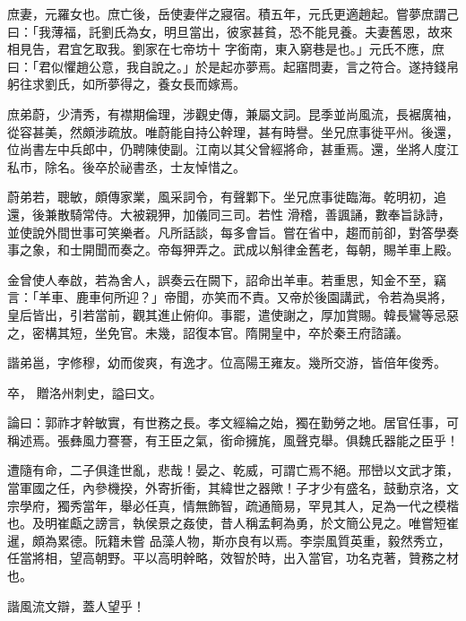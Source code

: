 \begin{pinyinscope}
 庶妻，元羅女也。庶亡後，岳使妻伴之寢宿。積五年，元氏更適趙起。嘗夢庶謂己曰：「我薄福，託劉氏為女，明旦當出，彼家甚貧，恐不能見養。夫妻舊恩，故來相見告，君宜乞取我。劉家在七帝坊十
 字銜南，東入窮巷是也。」元氏不應，庶曰：「君似懼趙公意，我自說之。」於是起亦夢焉。起寤問妻，言之符合。遂持錢帛躬往求劉氏，如所夢得之，養女長而嫁焉。



 庶弟蔚，少清秀，有襟期倫理，涉觀史傳，兼屬文詞。昆季並尚風流，長裾廣袖，從容甚美，然頗涉疏放。唯蔚能自持公幹理，甚有時譽。坐兄庶事徙平州。後還，位尚書左中兵郎中，仍聘陳使副。江南以其父曾經將命，甚重焉。還，坐將人度江私市，除名。後卒於祕書丞，士友悼惜之。



 蔚弟若，聰敏，頗傳家業，風采詞令，有聲鄴下。坐兄庶事徙臨海。乾明初，追還，後兼散騎常侍。大被親狎，加儀同三司。若性
 滑稽，善諷誦，數奉旨詠詩，並使說外間世事可笑樂者。凡所話談，每多會旨。嘗在省中，趨而前卻，對答學奏事之象，和士開聞而奏之。帝每狎弄之。武成以斛律金舊老，每朝，賜羊車上殿。



 金曾使人奉啟，若為舍人，誤奏云在闕下，詔命出羊車。若重思，知金不至，竊言：「羊車、鹿車何所迎？」帝聞，亦笑而不責。又帝於後園講武，令若為吳將，皇后皆出，引若當前，觀其進止俯仰。事罷，遣使謝之，厚加賞賜。韓長鸞等忌惡之，密構其短，坐免官。未幾，詔復本官。隋開皇中，卒於秦王府諮議。



 諧弟邕，字修穆，幼而俊爽，有逸才。位高陽王雍友。幾所交游，皆倍年俊秀。



 卒，
 贈洛州刺史，謚曰文。



 論曰：郭祚才幹敏實，有世務之長。孝文經綸之始，獨在勤勞之地。居官任事，可稱述焉。張彝風力謇謇，有王臣之氣，銜命擁旄，風聲克舉。俱魏氏器能之臣乎！



 遭隨有命，二子俱逢世亂，悲哉！晏之、乾威，可謂亡焉不絕。邢巒以文武才策，當軍國之任，內參機揆，外寄折衝，其緯世之器歟！子才少有盛名，鼓動京洛，文宗學府，獨秀當年，舉必任真，情無飾智，疏通簡易，罕見其人，足為一代之模楷也。及明崔甗之謗言，執侯景之姦使，昔人稱孟軻為勇，於文簡公見之。唯嘗短崔暹，頗為累德。阮籍未嘗
 品藻人物，斯亦良有以焉。李崇風質英重，毅然秀立，任當將相，望高朝野。平以高明幹略，效智於時，出入當官，功名克著，贊務之材也。



 諧風流文辯，蓋人望乎！



\end{pinyinscope}